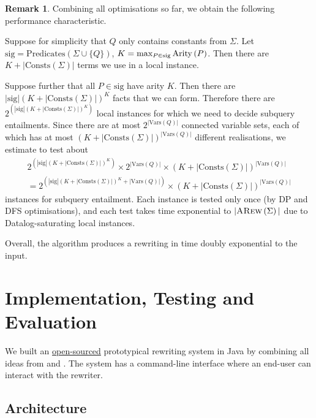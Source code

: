 \documentclass[12pt]{report}
\theoremstyle{plain}
\theoremstyle{definition}
\newtheorem{remark}[theorem]{Remark}
\def\Vars{{\mathrm{Vars}}}
\def\Consts{{\mathrm{Consts}}}
\def\Predicates{{\mathrm{Predicates}}}
\newcommand{\Arity}[1]{\ensuremath{\normalfont{\operatorname{Arity}} \left( #1 \right)}}
\newcommand{\ARew}[1]{\ensuremath{\normalfont{\textsc{ARew}} \left( #1 \right)}}
\begin{document}
\begin{remark}
\label{remark:rewriting-complexity}
  Combining all optimisations so far, we obtain the following performance characteristic.
  
  Suppose for simplicity that $Q$ only contains constants from $\Sigma$. Let $\mathrm{sig} = \Predicates(\Sigma \cup \{Q\})$, $K = \max_{P \in \mathrm{sig}} \Arity{P}$. Then there are $K + |\Consts(\Sigma)|$ terms we use in a local instance.

  Suppose further that all $P \in \mathrm{sig}$ have arity $K$. Then there are $|\mathrm{sig}| (K + |\Consts(\Sigma)|)^K$ facts that we can form. Therefore there are $2^{\left(|\mathrm{sig}| (K + |\Consts(\Sigma)|)^K\right)}$ local instances for which we need to decide subquery entailments. Since there are at most $2^{|\Vars(Q)|}$ connected variable sets, each of which has at most $(K + |\Consts(\Sigma)|)^{|\Vars(Q)|}$ different realisations, we estimate to test about \begin{multline}
  \label{equation:subquery-entailment-instances-number-estimation}
    2^{\left(|\mathrm{sig}| (K + |\Consts(\Sigma)|)^K\right)} \times 2^{|\Vars(Q)|} \times (K + |\Consts(\Sigma)|)^{|\Vars(Q)|} \\
    = 2^{\left(|\mathrm{sig}| (K + |\Consts(\Sigma)|)^K + |\Vars(Q)|\right)} \times (K + |\Consts(\Sigma)|)^{|\Vars(Q)|}
  \end{multline}
  instances for subquery entailment. Each instance is tested only once (by DP and DFS optimisations), and each test takes time exponential to $|\ARew{\Sigma}|$ due to Datalog-saturating local instances.

  Overall, the algorithm produces a rewriting in time doubly exponential to the input.
\end{remark}

\newpage
\chapter{Implementation, Testing and Evaluation}

We built an \href{https://github.com/kory33/guarded-queries}{open-sourced} prototypical rewriting system in Java by combining all ideas from  and . The system has a command-line interface where an end-user can interact with the rewriter.

\section{Architecture}
\end{document}
